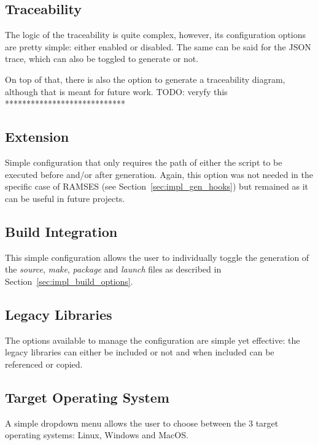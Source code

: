 \subsection{Traceability}
\label{sec:dsl_trace}

The logic of the traceability is quite complex, however, its configuration options are pretty simple: either enabled or disabled. The same can be said for the \gls{JSON} trace, which can also be toggled to generate or not.

On top of that, there is also the option to generate a traceability diagram, although that is meant for future work. TODO: veryfy this ****************************



\subsection{Extension}
\label{sec:dsl_ext}

Simple configuration that only requires the path of either the script to be executed before and/or after generation. Again, this option was not needed in the specific case of \gls{RAMSES} (see Section~\ref{sec:impl_gen_hooks}) but remained as it can be useful in future projects.



\subsection{Build Integration}
\label{sec:dsl_build}

This simple configuration allows the user to individually toggle the generation of the \textit{source}, \textit{make}, \textit{package} and \textit{launch} files as described in Section~\ref{sec:impl_build_options}.



\subsection{Legacy Libraries}
\label{sec:dsl_legacy}

The options available to manage the configuration are simple yet effective: the legacy libraries can either be included or not and when included can be referenced or copied.



\subsection{Target Operating System}
\label{sec:dsl_os}

A simple dropdown menu allows the user to choose between the 3 target operating systems: Linux, Windows and MacOS.





















